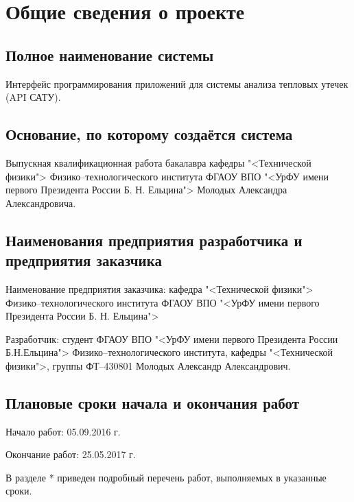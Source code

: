 \chapter{\enskip Общие сведения о проекте}

\section{\enskip Полное наименование системы}

\par
	Интерфейс программирования приложений для системы анализа тепловых утечек (API САТУ).

\section{\enskip Основание, по которому создаётся система}

\par
	Выпускная квалификационная работа бакалавра кафедры "<Технической физики"> Физико–технологи­ческого института ФГАОУ ВПО "<УрФУ имени первого Президента России Б. Н. Ельцина"> Молодых Александра Александровича.

\section{\enskip \nohyphens{Наименования предприятия разработчика и предприятия заказчика}}

\par
	Наименование предприятия заказчика: кафедра "<Технической физики"> Физико–технологи­ческого института ФГАОУ ВПО "<УрФУ имени первого Президента России Б. Н. Ельцина">

	Разработчик: студент ФГАОУ ВПО "<УрФУ имени первого Президента России Б.Н.Ельцина"> Физико–технологического института, кафедры "<Технической физики">, группы ФТ–430801 Молодых Александр Александрович.

\section{\enskip Плановые сроки начала и окончания работ}
	Начало работ: 05.09.2016 г.
	
	Окончание работ: 25.05.2017 г.
 
	В разделе * приведен подробный перечень работ, выполняемых в указанные сроки.
